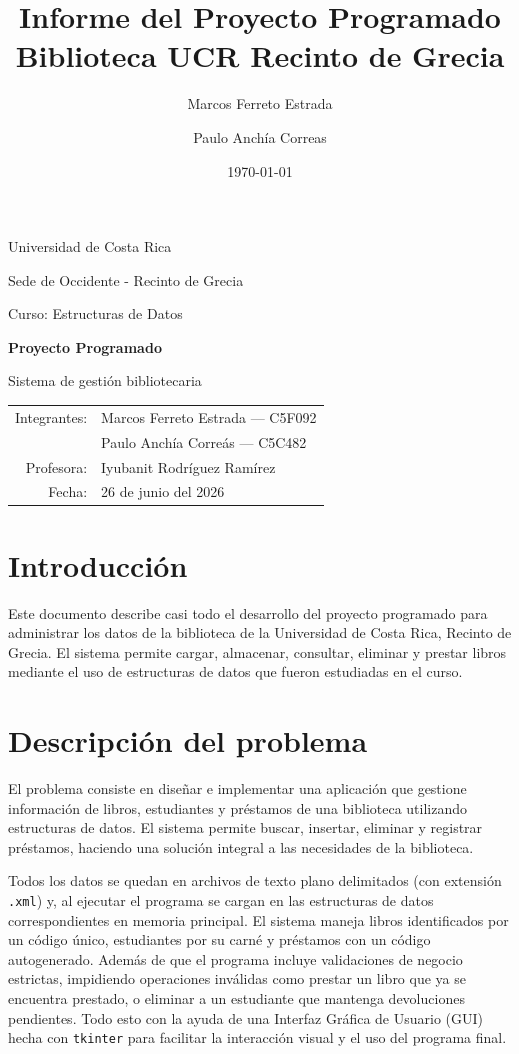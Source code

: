 \documentclass[11pt]{article}
\title{Informe del Proyecto Programado\\Biblioteca UCR Recinto de Grecia}
\author{Marcos Ferreto Estrada \and Paulo Anchía Correas}
\date{\today}
\begin{document}
\begin{titlepage}
    \centering
    {\Large Universidad de Costa Rica\par}
    {\large Sede de Occidente - Recinto de Grecia\par}
    {\large Curso: Estructuras de Datos\par}

    \vspace{2.5cm}
    {\LARGE\bfseries Proyecto Programado\par}
    {\Large Sistema de gestión bibliotecaria\par}

    \vspace{2.5cm}
    \begin{tabular}{rl}
        Integrantes: & Marcos Ferreto Estrada --- C5F092 \\
                     & Paulo Anchía Correás --- C5C482 \\
        Profesora:   & Iyubanit Rodríguez Ramírez \\
        Fecha:       & 26 de junio del 2026 \\
    \end{tabular}

    \vfill
\end{titlepage}

\tableofcontents
\newpage

\section{Introducción}

Este documento describe casi todo el desarrollo del proyecto programado para administrar los datos de la biblioteca de la Universidad de Costa Rica, Recinto de Grecia. El sistema permite cargar, almacenar, consultar, eliminar y prestar libros mediante el uso de estructuras de datos que fueron estudiadas en el curso. 

\section{Descripción del problema}

El problema consiste en diseñar e implementar una aplicación que gestione información de libros, estudiantes y préstamos de una biblioteca utilizando estructuras de datos. El sistema permite buscar, insertar, eliminar y registrar préstamos, haciendo una solución integral a las necesidades de la biblioteca.

Todos los datos se quedan en archivos de texto plano delimitados (con extensión \texttt{.xml}) y, al ejecutar el programa se cargan en las estructuras de datos correspondientes en memoria principal. El sistema maneja libros identificados por un código único, estudiantes por su carné y préstamos con un código autogenerado. Además de que el programa incluye validaciones de negocio estrictas, impidiendo operaciones inválidas como prestar un libro que ya se encuentra prestado, o eliminar a un estudiante que mantenga devoluciones pendientes. Todo esto con la ayuda de una Interfaz Gráfica de Usuario (GUI) hecha con \texttt{tkinter} para facilitar la interacción visual y el uso del programa final.
\end{document}
